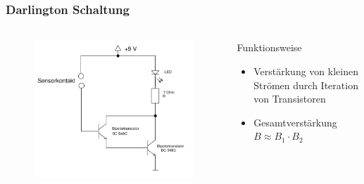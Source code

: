 \begin{frame}
    \frametitle{Darlington Schaltung}
    \framesubtitle{}
    \begin{columns}[c]
        \begin{figure}[H]
        \begin{center}
                \includegraphics[scale=0.3]{./img/schaltungen/darlington.png}
        \end{center}
        \end{figure}
    \begin{block}{Funktionsweise}
     \begin{itemize}
        \item Verstärkung von kleinen Strömen durch Iteration von Transistoren
        \item Gesamtverstärkung $B \approx B_1 \cdot B_2$
     \end{itemize}
    \end{block}
    \end{columns}
\end{frame}
